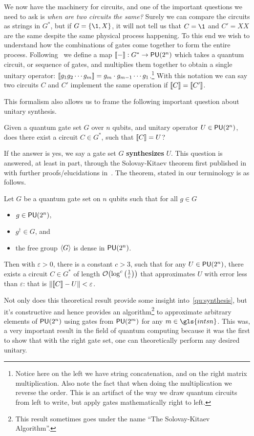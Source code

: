 We now have the machinery for circuits, and one of the important questions we need to ask is \emph{when are two circuits the same?}
Surely we can compare the circuits as strings in $G^*$, but if $G = \qty{\1, X}$, it will not tell us that $C = \1$ and $C' = XX$ are the same despite the same physical process happening.
To this end we wish to understand how the combinations of gates come together to form the entire process.
Following~\cite{formalcircuit} we define a map $\llbracket-\rrbracket: G^* \to \mathsf{PU} (2^n)$ which takes a quantum circuit, or sequence of gates, and multiplies them together to obtain a single unitary operator: $\llbracket g_1g_2\cdots g_m\rrbracket = g_m\cdot g_{m-1} \cdots g_1$.\footnote{Notice here on the left we have string concatenation, and on the right matrix multiplication. Also note the fact that when doing the multiplication we reverse the order. This is an artifact of the way we draw quantum circuits from left to write, but apply gates mathematically right to left.}
With this notation we can say two circuits $C$ and $C'$ implement the same operation if $\llbracket C\rrbracket = \llbracket C'\rrbracket$.

This formalism also allows us to frame the following important question about unitary synthesis.
\begin{question}\label{qu:synthesis}
    Given a quantum gate set $G$ over $n$ qubits, and unitary operator $U \in \mathsf{PU} (2^n)$, does there exist a circuit $C\in G^*$, such that $\llbracket C\rrbracket = U$?
\end{question}
If the answer is yes, we say a gate set $G$ \textbf{synthesizes} $U$.
This question is answered, at least in part, through the Solovay-Kitaev theorem first published in~\cite{bigkitaev} with further proofs/elucidations in~\cite{nielsenchuang,solovay-kitaev,kitaev-book}.
The theorem, stated in our terminology is as follows.
\begin{theorem}\label{thm:solovaykitaev}
    Let $G$ be a quantum gate set on $n$ qubits such that for all $g \in G$
    \begin{itemize}
        \item $g \in \mathsf{PU} (2^n)$,
        \item $g^\dagger \in G$, and
        \item the free group $\expval{G}$ is dense in $\mathsf{PU} (2^n)$.
    \end{itemize}
    Then with $\varepsilon > 0$, there is a constant $c > 3$, such that for any $U \in \mathsf{PU} (2^n)$, there exists a circuit $C \in G^*$ of length $\order{\log^c\qty(\frac{1}{\varepsilon})}$ that approximates $U$ with error less than $\varepsilon$: that is $\norm{\llbracket C\rrbracket - U} < \varepsilon$.
\end{theorem}
Not only does this theoretical result provide some insight into~\ref{qu:synthesis}, but it's constructive and hence provides an algorithm\footnote{This result sometimes goes under the name ``The Solovay-Kitaev Algorithm''.} to approximate arbitrary elements of $\mathsf{PU} (2^n)$ using gates from $\mathsf{PU} (2^m)$ for any $m \in \gls{intsn}$.
This was, a very important result in the field of quantum computing because it was the first to show that with the right gate set, one can theoretically perform any desired unitary.


